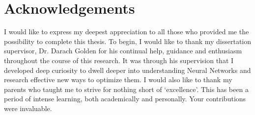 \documentclass[a4paper,oneside,12pt]{book}
\begin{document}
\section*{\Huge{Acknowledgements}}

I would like to express my deepest appreciation to all those who provided me the possibility to complete this thesis. To begin, I would like to thank my dissertation supervisor, Dr. Darach Golden for his continual help, guidance and enthusiasm throughout the course of this research. It was through his supervision that I developed deep curiosity to dwell deeper into understanding Neural Networks and research effective new ways to optimize them. I would also like to thank my parents who taught me to strive for nothing short of ‘excellence’. This has been a period of intense learning, both academically and personally. Your contributions were invaluable. 


\tableofcontents
\listoffigures
\newpage


\mainmatter

%
%
%
%


%
\end{document}
